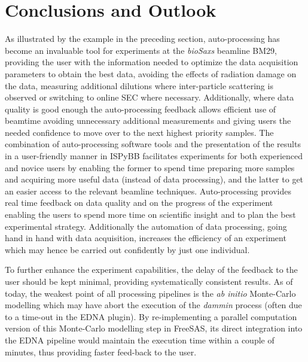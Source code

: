 \documentclass[preprint,pdf]{iucr}              %
\begin{document}

\section{Conclusions and Outlook}
As illustrated by the example in the preceding section, auto-processing has
become an invaluable tool for experiments at the \textit{bioSaxs} beamline BM29, 
providing the user with the information needed to optimize the
data acquisition parameters to obtain the best data, avoiding the effects of
radiation damage on the data, measuring additional dilutions where inter-particle 
scattering is observed or switching to online SEC where necessary. 
Additionally, where data quality is good enough the auto-processing feedback
allows efficient use of beamtime avoiding unnecessary additional measurements
and giving users the needed confidence to move over to the next highest priority
samples.
The combination of auto-processing software tools and
the presentation of the results in a user-friendly manner in ISPyBB facilitates
experiments for both experienced and novice users by enabling the former to
spend time preparing more samples and acquiring more useful data (instead of
data processing), and the latter to get an easier access to the relevant
beamline techniques.
Auto-processing provides real time feedback on data quality and on the progress 
of the experiment enabling the users to spend more time on scientific insight
and to plan the best experimental strategy.
Additionally the automation of data processing, going hand in hand with
data acquisition, increases the efficiency of an experiment
which may hence be carried out confidently by just one individual.

To further enhance the experiment capabilities, the delay of the feedback to the
user should be kept minimal, providing systematically consistent results.
As of today, the weakest point of all processing pipelines is the
\textit{ab initio} Monte-Carlo modelling which may have abort the
execution of the \textit{dammin} process (often due to a time-out in
the EDNA plugin).
By re-implementing a parallel computation version of this Monte-Carlo modelling
step in FreeSAS, its direct integration into the
EDNA pipeline would maintain the execution time within a couple of minutes,
thus providing faster feed-back to the user.

\end{document}
